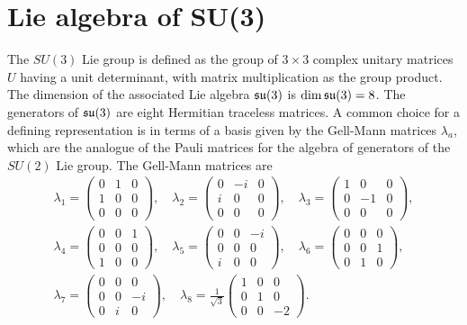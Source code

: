 \section{Lie algebra of SU(3)}
The $SU(3)$ Lie group is defined as the group of $3 \times 3$ complex unitary matrices $U$ having a unit determinant, with matrix multiplication as the group product. The dimension of the associated Lie algebra $\mathfrak{su}(3)$ is $\dim{\mathfrak{su}(3)} = 8$. The generators of $\mathfrak{su}(3)$ are eight Hermitian traceless matrices. A common choice for a defining representation is in terms of a basis given by the Gell-Mann matrices $\lambda_a$, which are the analogue of the Pauli matrices for the algebra of generators of the $SU(2)$ Lie group. The Gell-Mann matrices are
\begin{gather}
    \lambda_1 = 
    \begin{pmatrix}
        0 & 1 & 0 \\
        1 & 0 & 0 \\
        0 & 0 & 0
    \end{pmatrix},\quad 
    \lambda_2 = 
    \begin{pmatrix}
        0 & -i & 0 \\
        i & 0 & 0 \\
        0 & 0 & 0
    \end{pmatrix},\quad 
    \lambda_3 = 
    \begin{pmatrix}
        1 & 0 & 0 \\
        0 & -1 & 0 \\
        0 & 0 & 0
    \end{pmatrix}, \\ 
    \lambda_4 = 
    \begin{pmatrix}
        0 & 0 & 1 \\
        0 & 0 & 0 \\
        1 & 0 & 0
    \end{pmatrix},\quad
    \lambda_5 = 
    \begin{pmatrix}
        0 & 0 & -i \\
        0 & 0 & 0 \\
        i & 0 & 0
    \end{pmatrix},\quad 
    \lambda_6 = 
    \begin{pmatrix}
        0 & 0 & 0 \\
        0 & 0 & 1 \\
        0 & 1 & 0
    \end{pmatrix}, \\ 
    \lambda_7 = 
    \begin{pmatrix}
        0 & 0 & 0 \\
        0 & 0 & -i \\
        0 & i & 0
    \end{pmatrix},\quad 
    \lambda_8 = \frac{1}{\sqrt{3}} 
    \begin{pmatrix}
        1 & 0 & 0 \\
        0 & 1 & 0 \\
        0 & 0 & -2
    \end{pmatrix}.
\end{gather}
